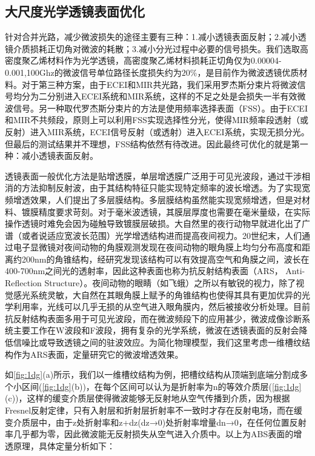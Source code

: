 \subsection{大尺度光学透镜表面优化}
针对合并光路，减少微波损失的途径主要有三种：1.减小透镜表面反射；2.减小透镜介质损耗正切角对微波的耗散；3.减小分光过程中必要的信号损失。我们选取高密度聚乙烯材料作为光学透镜，高密度聚乙烯材料损耗正切角仅为0.00004-0.001,100Ghz的微波信号单位路径长度损失约为$20\%$，是目前作为微波透镜优质材料。对于第三种方案，由于ECEI和MIR共光路，我们采用罗杰斯分束片将微波信号均分为二分别进入ECEI系统和MIR系统，这样的不足之处是会损失一半有效微波信号。另一种取代罗杰斯分束片的方法是使用频率选择表面（FSS）。由于ECEI和MIR不共频段，原则上可以利用FSS实现选择性分光，使得MIR频率段透射（或反射）进入MIR系统，ECEI信号反射（或透射）进入ECEI系统，实现无损分光。但最后的测试结果并不理想，FSS结构依然有待改进。因此最终可优化的就是第一种：减小透镜表面反射。
\par 透镜表面一般优化方法是贴增透膜，单层增透膜广泛用于可见光波段，通过干涉相消的方法抑制反射波，由于其结构特征只能实现特定频率的波长增透。为了实现宽频增透效果，人们提出了多层膜结构\cite{RN2059}。多层膜结构虽然能实现宽频增透，但是对材料、镀膜精度要求苛刻。对于毫米波透镜，其膜层厚度也需要在毫米量级，在实际操作透镜时难免会因为碰触导致镀膜层破损。大自然里的夜行动物早就进化出了广谱（或者说适应宽波长范围）光学增透结构进而提高夜间视力。20世纪末，人们通过电子显微镜对夜间动物的角膜观测发现在夜间动物的眼角膜上均匀分布高度和距离约200nm的角锥结构\cite{RN693}，经研究发现该结构可以有效提高空气和角膜之间，波长在400-700nm之间光的透射率，因此这种表面也称为抗反射结构表面（ARS， Anti-Reflection Structure）。夜间动物的眼睛（如飞蛾）之所以有敏锐的视力，除了视觉感光系统灵敏，大自然在其眼角膜上赋予的角锥结构也使得其具有更加优异的光学利用率，光线可以几乎无损的从空气进入眼角膜内，然后被接收分析处理。目前抗反射结构表面多用于可见光波段，而在微波频段下的应用甚少，微波成像诊断系统主要工作在W波段和F波段，拥有复杂的光学系统，微波在透镜表面的反射会降低信噪比或导致透镜之间的驻波效应。为简化物理模型，我们这里考虑一维槽纹结构作为ARS表面，定量研究它的微波增透效果。\par
如\autoref{fig:1dg}(a)所示，我们以一维槽纹结构为例，把槽纹结构从顶端到底端分割成多个小区间(\autoref{fig:1dg}(b))，在每个区间可以认为是折射率为n的等效介质层(\autoref{fig:1dg}(c))，这样的缓变介质层使得微波能够无反射地从空气传播到介质，因为根据Fresnel反射定律，只有入射层和折射层折射率不一致时才存在反射电场，而在缓变介质层中，由于z处折射率和z+dz(dz→0)处折射率增量dn→0，在任何位置反射率几乎都为零，因此微波能无反射损失从空气进入介质中。以上为ABS表面的增透原理，具体定量分析如下：\par
